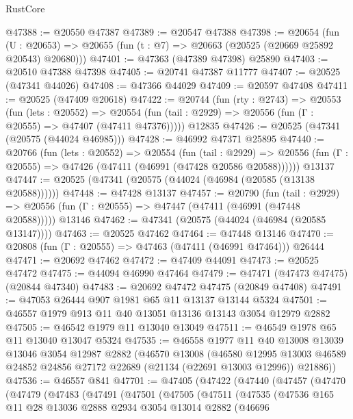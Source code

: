 \begin{lexlean}{RustCore}
\begin{coremodule}
@47388 := @20550 @47387
@47389 := @20547 @47388
@47398 := @20654
    (fun (U : @20653) => @20655 (fun (t : @7) => @20663 (@20525 (@20669 @25892 @20543) @20680)))
@47401 := @47363 (@47389 @47398) @25890
@47403 := @20510 @47388 @47398
@47405 := @20741 @47387 @11777
@47407 := @20525 (@47341 @44026)
@47408 := @47366 @44029
@47409 := @20597 @47408
@47411 := @20525 (@47409 @20618)
@47422 := @20744
    (fun (rty : @2743) =>
    @20553
      (fun (lets : @20552) =>
      @20554 (fun (tail : @2929) => @20556 (fun (Γ : @20555) => @47407 (@47411 @47376)))))
    @12835
@47426 := @20525 (@47341 (@20575 (@44024 @46985)))
@47428 := @46992 @47371 @25895
@47440 := @20766
    (fun (lets : @20552) =>
    @20554
      (fun (tail : @2929) =>
      @20556 (fun (Γ : @20555) => @47426 (@47411 (@46991 (@47428 @20586 @20588))))))
    @13137
@47447 := @20525 (@47341 (@20575 (@44024 (@46984 (@20585 (@13138 @20588))))))
@47448 := @47428 @13137
@47457 := @20790
    (fun (tail : @2929) => @20556 (fun (Γ : @20555) => @47447 (@47411 (@46991 (@47448 @20588)))))
    @13146
@47462 := @47341 (@20575 (@44024 (@46984 (@20585 @13147))))
@47463 := @20525 @47462
@47464 := @47448 @13146
@47470 := @20808 (fun (Γ : @20555) => @47463 (@47411 (@46991 @47464))) @26444
@47471 := @20692 @47462
@47472 := @47409 @44091
@47473 := @20525 @47472
@47475 := @44094 @46990 @47464
@47479 := @47471 (@47473 @47475) (@20844 @47340)
@47483 := @20692 @47472 @47475 (@20849 @47408)
@47491 := @47053 @26444 @907 @1981 @65 @11 @13137 @13144 @5324
@47501 := @46557 @1979 @913 @11 @40 @13051 @13136 @13143 @3054 @12979 @2882
@47505 := @46542 @1979 @11 @13040 @13049
@47511 := @46549 @1978 @65 @11 @13040 @13047 @5324
@47535 := @46558
    @1977
    @11
    @40
    @13008
    @13039
    @13046
    @3054
    @12987
    @2882
    (@46570
      @13008
      (@46580
        @12995
        @13003
        @46589
        @24852
        @24856
        @27172
        @22689
        (@21134 (@22691 @13003 @12996))
        @21886))
@47536 := @46557 @841
@47701 := @47405
    (@47422
      (@47440
        (@47457
          (@47470
            (@47479
              (@47483
                (@47491
                  (@47501
                    (@47505
                      (@47511
                        (@47535
                          (@47536
                            @165
                            @11
                            @28
                            @13036
                            @2888
                            @2934
                            @3054
                            @13014
                            @2882
                            (@46696

\end{coremodule}
\end{lexlean}
